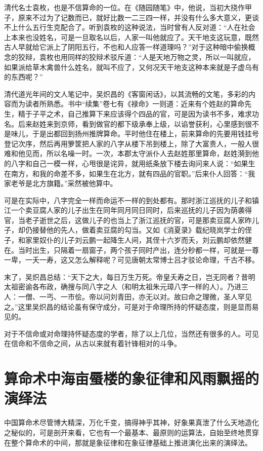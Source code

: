 \documentclass[a5paper,oneside,12pt]{ctexbook}
\begin{document}
{{清代名士袁枚，也是不信算命的一位。在《随园随笔》中，他说，当初大挠作甲子，原来不过为了记数而已，就好比数一二三四一样，并没有什么多大意义，更谈不上什么五行生克配合了。听到袁枚的这种说法，当时曾有人反对道：“人在社会上本来也没姓名，可是一旦取名以后，人家一叫他就应了。天干地支这玩意，既然古人早就给它派上了阴阳五行，不也和人应答一样道理吗？”对于这种暗中偷换概念的狡辩，袁枚也用同样的狡辩术驳斥道：“人是天地万物之灵，所以一叫就应，如果派给草木禽兽什么姓名，就叫不应了，又何况天干地支这种本来就是子虚乌有的东西呢？”

清代道光年间的文人笔记中，吴炽昌的《客窗闲话》，以其流畅的文笔，多彩的内容而为读者所熟悉。书中“续集”卷七有《禄命》一则道：近来有个姓赵的算命先生，精于子平之术，自己推算下来应该得个四品的官，可是因为读书不多，难求功名。后来赵姓来到京师，看到做官的都下级承奉上级，以谄誉获利，心里感到很不是味儿，于是出都回到扬州推牌算命。平时他住在楼上，前来算命的先要用钱挂号登记次序，然后再用箩筐把人家的八字从楼下吊到楼上，除了大富贵人，一般人很难和他见而，所以名噪一时。一次，本郡太守派仆人去赵姓那里算命，赵姓漪到他的八字和自己一模一样，心甩很是诧异，就用纸条放下楼去询问来人说：“如果生在南方，和我的命差不多，如果生在北方，就有四品的官职。”后来仆人回答：“我家老爷是北方旗籍。”采然被他算中。

可是在实际中，八字完全一样而命运不一样的到处都有。那时浙江巡抚的儿子和镇江一个卖豆腐人家的儿子出生在同年同月同日同时，后来巡抚的儿子因为荫袭得官，当老子逝世之后，这做儿子的也当上了浙江巡抚的官，可是那卖豆腐人家昨儿子，却仍接替他的先人，做着卖豆腐的勾当。又如《消夏录》载纪晓岚学士的侄子，和家里奴仆的儿子刘云鹏一起降生人间，其侄十六岁而夭，刘云鹏却依然健在。当时出生，只隔着一扇窗子，两个孩子同时产出，连分秒都一样，可就是一尊一卑，一夭一寿，这又怎么解释呢？可见唐朝太常博士吕才驳论命理，千古不移。

末了，吴炽昌总结：“天下之大，每日万生万死。帝皇夭寿之日，岂无同者？昔明太祖密谕各布政，确搜与同八字之人（和明太祖朱元璋八字一样的人）。乃进三人：一僧、一丐、一市侩。帝以问刘青田，亦无以对。故曰命之理微，圣人罕见之。”这里吴炽昌的结论虽有保守成分，可是对于命理所持的怀疑态度，则是显而易见的。

对于不信命或对命理持怀疑态度的学者，除了以上几位，当然还有很多的人。可见在信命和不信命之间，从古以来就有着针锋相对的斗争。

\section{算命术中海亩蜃楼的象征律和风雨飘摇的演绎法}

中国算命术尽管博大精深，万化千变，搞得神乎其神，好象果真泄了什么天地造化之秘似的，可是剖开来看，它也有一个最基本、最原则的运算法，自始至终地贯穿在整个算命术的中间，那就是象征律和在象征律基础上推进演化出来的演绎法。

}}
\end{document}
